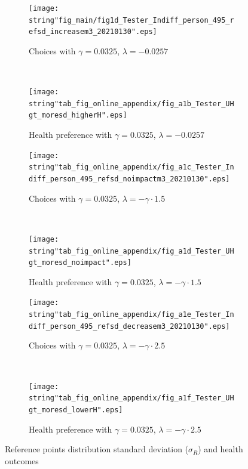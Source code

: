 \newcommand{\subFigWidthApp}{0.50}
\begin{figure}[hbt!]
    \centering
    \begin{subfigure}[b]{\subFigWidthApp\textwidth}
        \centering
        \texttt{[image: \\string"fig\_main/fig1d\_Tester\_Indiff\_person\_495\_refsd\_increasem3\_20210130".eps]}
        \caption{Choices with $\gamma=0.0325$, $\lambda=-0.0257$}
    \end{subfigure}~
	\begin{subfigure}[b]{\subFigWidthApp\textwidth}
	    \centering
    	\texttt{[image: \\string"tab\_fig\_online\_appendix/fig\_a1b\_Tester\_UHgt\_moresd\_higherH".eps]}
    	\caption{Health preference with $\gamma=0.0325$, $\lambda=-0.0257$}
	\end{subfigure}
	\par\medskip
	\begin{subfigure}[b]{\subFigWidthApp\textwidth}
        \centering
        \texttt{[image: \\string"tab\_fig\_online\_appendix/fig\_a1c\_Tester\_Indiff\_person\_495\_refsd\_noimpactm3\_20210130".eps]}
        \caption{Choices with $\gamma=0.0325$, $\lambda=-\gamma\cdot1.5$}
    \end{subfigure}~
	\begin{subfigure}[b]{\subFigWidthApp\textwidth}
	    \centering
	    \texttt{[image: \\string"tab\_fig\_online\_appendix/fig\_a1d\_Tester\_UHgt\_moresd\_noimpact".eps]}
	    \caption{Health preference with $\gamma=0.0325$, $\lambda=-\gamma\cdot1.5$}
	\end{subfigure}
	\par\medskip
	\begin{subfigure}[b]{\subFigWidthApp\textwidth}
        \centering
        \texttt{[image: \\string"tab\_fig\_online\_appendix/fig\_a1e\_Tester\_Indiff\_person\_495\_refsd\_decreasem3\_20210130".eps]}
        \caption{Choices with $\gamma=0.0325$, $\lambda=-\gamma\cdot2.5$}
    \end{subfigure}~
	\begin{subfigure}[b]{\subFigWidthApp\textwidth}
	    \centering
	    \texttt{[image: \\string"tab\_fig\_online\_appendix/fig\_a1f\_Tester\_UHgt\_moresd\_lowerH".eps]}
	    \caption{Health preference with $\gamma=0.0325$, $\lambda=-\gamma\cdot2.5$}
	\end{subfigure}
	\caption{Reference points distribution standard deviation ($\sigma_R$) and health outcomes}
	\label{fig:refpointhgtutil}
\end{figure}
\pagebreak


